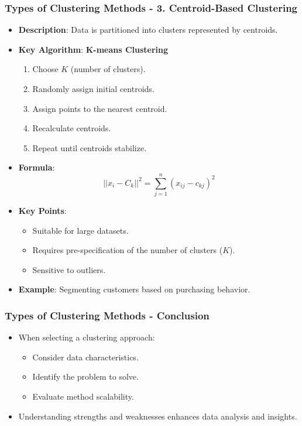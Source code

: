 \documentclass{beamer}
\begin{document}
\begin{frame}[fragile]
    \frametitle{Types of Clustering Methods - 3. Centroid-Based Clustering}
    \begin{itemize}
        \item \textbf{Description}: Data is partitioned into clusters represented by centroids.
        \item \textbf{Key Algorithm}: \textbf{K-means Clustering}
        \begin{enumerate}
            \item Choose $K$ (number of clusters).
            \item Randomly assign initial centroids.
            \item Assign points to the nearest centroid.
            \item Recalculate centroids.
            \item Repeat until centroids stabilize.
        \end{enumerate}
        \item \textbf{Formula}:
        \begin{equation}
            ||x_i - C_k||^2 = \sum_{j=1}^{n}(x_{ij} - c_{kj})^2
        \end{equation}        
        \item \textbf{Key Points}:
        \begin{itemize}
            \item Suitable for large datasets.
            \item Requires pre-specification of the number of clusters ($K$).
            \item Sensitive to outliers.
        \end{itemize}
        \item \textbf{Example}: Segmenting customers based on purchasing behavior.
    \end{itemize}
\end{frame}

\begin{frame}[fragile]
    \frametitle{Types of Clustering Methods - Conclusion}
    \begin{itemize}
        \item When selecting a clustering approach:
        \begin{itemize}
            \item Consider data characteristics.
            \item Identify the problem to solve.
            \item Evaluate method scalability.
        \end{itemize}
        \item Understanding strengths and weaknesses enhances data analysis and insights.
    \end{itemize}
\end{frame}
\end{document}
